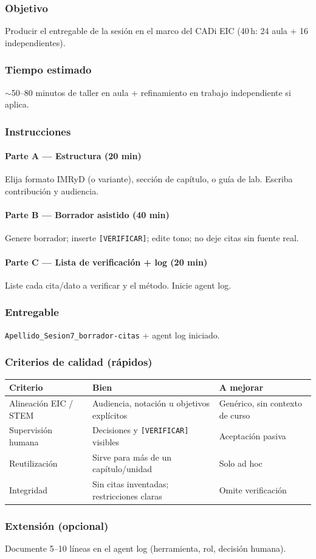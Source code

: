 \subsubsection*{Objetivo}
Producir el entregable de la sesión en el marco del CADi EIC (40\,h: 24 aula + 16 independientes).

\subsubsection*{Tiempo estimado}
$\sim$50--80 minutos de taller en aula + refinamiento en trabajo independiente si aplica.

\subsubsection*{Instrucciones}
\paragraph{Parte A --- Estructura (20 min)} Elija formato IMRyD (o variante), sección de capítulo, o guía de lab. Escriba contribución y audiencia.
\paragraph{Parte B --- Borrador asistido (40 min)} Genere borrador; inserte \texttt{[VERIFICAR]}; edite tono; no deje citas sin fuente real.
\paragraph{Parte C --- Lista de verificación + log (20 min)} Liste cada cita/dato a verificar y el método. Inicie agent log.

\subsubsection*{Entregable}
\texttt{Apellido\_Sesion7\_borrador-citas} + agent log iniciado.

\subsubsection*{Criterios de calidad (rápidos)}
\begin{tabularx}{\textwidth}{@{}lXX@{}}
\toprule
Criterio & Bien & A mejorar \\
\midrule
Alineación EIC / STEM & Audiencia, notación u objetivos explícitos & Genérico, sin contexto de curso \\
Supervisión humana & Decisiones y \texttt{[VERIFICAR]} visibles & Aceptación pasiva \\
Reutilización & Sirve para más de un capítulo/unidad & Solo ad hoc \\
Integridad & Sin citas inventadas; restricciones claras & Omite verificación \\
\bottomrule
\end{tabularx}

\subsubsection*{Extensión (opcional)}
Documente 5--10 líneas en el agent log (herramienta, rol, decisión humana).
